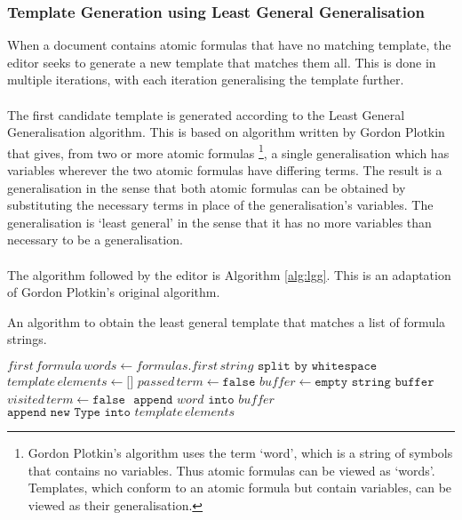 \documentclass[../main.tex]{subfiles}
\begin{document}
{\subsubsection{Template Generation using Least General Generalisation}
When a document contains atomic formulas that have no matching template, the editor seeks to generate a new template that matches them all. This is done in multiple iterations, with each iteration generalising the template further.
\\
\\
The first candidate template is generated according to the Least General Generalisation algorithm. This is based on algorithm written by Gordon Plotkin \cite[p~.155]{lgg_plotkin} that gives, from two or more atomic formulas \footnote{Gordon Plotkin's algorithm uses the term `word', which is a string of symbols that contains no variables. Thus atomic formulas can be viewed as `words'. Templates, which conform to an atomic formula but contain variables, can be viewed as their generalisation.}, a single generalisation which has variables wherever the two atomic formulas have differing terms. The result is a generalisation in the sense that both atomic formulas can be obtained by substituting the necessary terms in place of the generalisation's variables. The generalisation is `least general' in the sense that it has no more variables than necessary to be a generalisation.
\\
\\
The algorithm followed by the editor is Algorithm \ref{alg:lgg}. This is an adaptation of Gordon Plotkin's original algorithm. 
\begin{algorithm}
\caption{An algorithm to obtain the least general template that matches a list of formula strings.}\label{alg:lgg}
\begin{algorithmic}[1]
    \State $first \, formula \, words \gets formulas.first \, string \texttt{ split by whitespace}$
    \State $template \, elements \gets \texttt{[]}$
    \State $passed \, term \gets \texttt{false}$
    \State $buffer \gets \texttt{empty string buffer}$
    \State $visited \, term \gets \texttt{false}$
    \State $ $
            \State $\texttt{append } word \texttt{ into } buffer$
                \State $\texttt{append new Type into } template \, elements$

\end{algorithmic}
\end{algorithm}}
\end{document}
